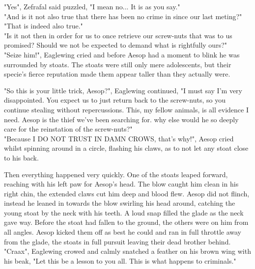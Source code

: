 \documentclass[smalldemyvopaper,11pt,twoside,onecolumn,openright,extrafontsizes]{memoir}
\begin{document}
"Yes", Zefrafal said puzzled, "I mean no... It is as you say."\\

"And is it not also true that there has been no crime in since our last meting?"\\

"That is indeed also true."\\

"Is it not then in order for us to once retrieve our screw-nuts that was to us promised? Should we not be expected to demand what is rightfully ours?"\\

"Seize him!", Eaglewing cried and before Aesop had a moment to blink he was surrounded by stoats. The stoats were still only mere adolescents, but their specie's fierce reputation made them appear taller than they actually were. 

"So this is your little trick, Aesop?", Eaglewing continued, "I must say I'm very disappointed. You expect us to just return back to the screw-nuts, so you continue stealing without repercussions. This, my fellow animals, is all evidence I need. Aesop is the thief we've been searching for. why else would he so deeply care for the reinstation of the screw-nuts?"\\


"Because I DO NOT TRUST IN DAMN CROWS, that's why!", Aesop cried whilst spinning around in a circle, flashing his claws, as to not let any stoat close to his back.

Then everything happened very quickly. One of the stoats leaped forward, reaching with his left paw for Aesop's head. The blow caught him clean in his right chin, the extended claws cut him deep and blood flew. Aesop did not flinch, instead he leaned in towards the blow swirling his head around, catching the young stoat by the neck with his teeth. A loud snap filled the glade as the neck gave way. Before the stoat had fallen to the ground, the others were on him from all angles. Aesop kicked them off as best he could and ran in full throttle away from the glade, the stoats in full pursuit leaving their dead brother behind.\\

"Craax", Eaglewing crowed and calmly snatched a feather on his brown wing with his beak, "Let this be a lesson to you all. This is what happens to criminals."
\end{document}
